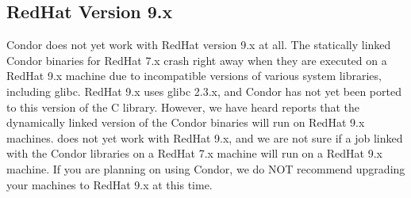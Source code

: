 \subsection{\label{sec:platform-linux-rh9}RedHat Version 9.x}

Condor \VersionNotice  does not yet work with RedHat version 9.x at
all.
The statically linked Condor binaries for RedHat 7.x crash right away
when they are executed on a RedHat 9.x machine due to incompatible
versions of various system libraries, including glibc.
RedHat 9.x uses glibc 2.3.x, and Condor has not yet been ported to
this version of the C library.
However, we have heard reports that the dynamically linked version of
the Condor binaries will run on RedHat 9.x machines.
 does not yet work with RedHat 9.x, and we are not
sure if a job linked with the Condor libraries on a RedHat 7.x machine
will run on a RedHat 9.x machine.  
If you are planning on using Condor, we do NOT recommend upgrading
your machines to RedHat 9.x at this time. 

